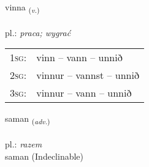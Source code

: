 \documentclass[frontgrid, backgrid]{flacards}\usepackage[]{graphicx}\usepackage[]{xcolor}
\begin{document}
\renewcommand{\blhead}{\vskip5pt {\small\bfseries\footnotesize Sagnorð | Verb }}
\renewcommand{\bcfoot}{\vskip5pt \hspace{2pt}{\small\bfseries\footnotesize 1K}}


{vinna \small{\textsubscript{(\textit{v.})}} \\[1ex] %
\textphonetic{[vɪna]} \\
pl.: \emph{praca; wygrać} \\  [2ex]
\renewcommand*{\arraystretch}{0.8}
\begin{tabular}{p{1cm}l}
\textsc{1sg}: & vinn -- vann -- unnið \\ 
\textsc{2sg}: & vinnur -- vannst -- unnið \\ 
\textsc{3sg}: & vinnur -- vann -- unnið \\ 
\end{tabular}
}


\renewcommand{\flhead}{\vskip5pt \fboxsep=0pt {\small\bfseries\footnotesize Atviksorð | Adverb}}
\renewcommand{\fcfoot}{\vskip5pt \fboxsep=0pt \hspace{2pt}{\small\bfseries\footnotesize 1K}}

\renewcommand{\blhead}{\vskip5pt {\small\bfseries\footnotesize Atviksorð | Adverb }}
\renewcommand{\bcfoot}{\vskip5pt \hspace{2pt}{\small\bfseries\footnotesize 1K}}


{saman \small{\textsubscript{(\textit{adv.})}} \\[1ex]
\textphonetic{[saːman]} \\
pl.: \emph{razem} \\  [2ex]
saman (Indeclinable)}

\renewcommand{\flhead}{\vskip5pt \fboxsep=0pt {\small\bfseries\footnotesize Sagnorð | Verb}}
\renewcommand{\fcfoot}{\vskip5pt \fboxsep=0pt \hspace{2pt}{\small\bfseries\footnotesize 1K}}

\renewcommand{\blhead}{\vskip5pt {\small\bfseries\footnotesize Sagnorð | Verb }}
\renewcommand{\bcfoot}{\vskip5pt \hspace{2pt}{\small\bfseries\footnotesize 1K}}
\end{document}

